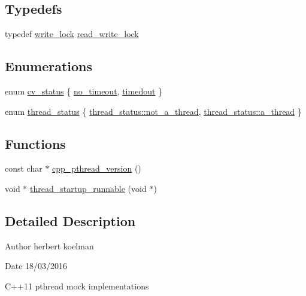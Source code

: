 \subsection*{Typedefs}
\begin{DoxyCompactItemize}
\item 
typedef \hyperlink{classpthread_1_1write__lock}{write\+\_\+lock} \hyperlink{group__concurrency_ga067fcec8c2b20e2e487c123c2f82d2df}{read\+\_\+write\+\_\+lock}
\end{DoxyCompactItemize}
\subsection*{Enumerations}
\begin{DoxyCompactItemize}
\item 
enum \hyperlink{group__concurrency_ga823f88a2bf448bd5bd5273b826830bdd}{cv\+\_\+status} \{ \hyperlink{group__concurrency_gga823f88a2bf448bd5bd5273b826830bdda633b1bc5140f77a22f2c26bea4fa3398}{no\+\_\+timeout}, 
\hyperlink{group__concurrency_gga823f88a2bf448bd5bd5273b826830bdda1c2d3e88a4ad820053c817753867b31a}{timedout}
 \}
\item 
enum \hyperlink{group__threads_gac4b6e78f3d72c946ace7a92f3bec4101}{thread\+\_\+status} \{ \hyperlink{group__threads_ggac4b6e78f3d72c946ace7a92f3bec4101a8414cd8c988083af4eabb1311df873cf}{thread\+\_\+status\+::not\+\_\+a\+\_\+thread}, 
\hyperlink{group__threads_ggac4b6e78f3d72c946ace7a92f3bec4101a13b3689524b86ca2caaee82399099df1}{thread\+\_\+status\+::a\+\_\+thread}
 \}
\end{DoxyCompactItemize}
\subsection*{Functions}
\begin{DoxyCompactItemize}
\item 
const char $\ast$ \hyperlink{namespacepthread_ad04d8bbcf57d64ba29047b53432a9ceb}{cpp\+\_\+pthread\+\_\+version} ()
\item 
void $\ast$ \hyperlink{group__threads_ga4ca2138b7b0d82d63a05c708edd45a6f}{thread\+\_\+startup\+\_\+runnable} (void $\ast$)
\end{DoxyCompactItemize}


\subsection{Detailed Description}
\begin{DoxyAuthor}{Author}
herbert koelman 
\end{DoxyAuthor}
\begin{DoxyDate}{Date}
18/03/2016
\end{DoxyDate}
C++11 pthread mock implementations 

